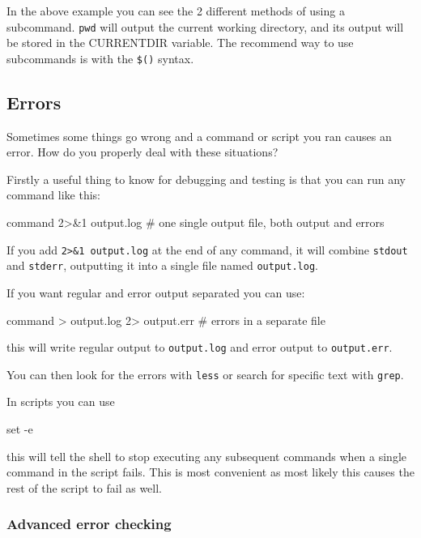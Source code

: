 In the above example you can see the 2 different methods of using a subcommand.
\lstinline|pwd| will output the current working directory, and its output will be
stored in the CURRENTDIR variable.  The recommend way to use subcommands is with
the \lstinline|$()| syntax.

\subsection{Errors}

Sometimes some things go wrong and a command or script you ran causes an error.
How do you properly deal with these situations?

Firstly a useful thing to know for debugging and testing is that you can run any
command like this:

\begin{prompt}
command 2>&1 output.log   # one single output file, both output and errors
\end{prompt}

If you add \lstinline|2>&1 output.log| at the end of any command, it will combine
\lstinline|stdout| and \lstinline|stderr|, outputting it into a single file named \lstinline|output.log|.

If you want regular and error output separated you can use:

\begin{prompt}
command > output.log 2> output.err  # errors in a separate file
\end{prompt}

this will write regular output to \lstinline|output.log| and error output to \lstinline|output.err|.

You can then look for the errors with \lstinline|less| or search for specific text with \lstinline|grep|.

In scripts you can use

\begin{prompt}
set -e
\end{prompt}

this will tell the shell to stop executing any subsequent commands when a single
command in the script fails. This is most convenient as most likely this causes
the rest of the script to fail as well.

\subsubsection{Advanced error checking}

